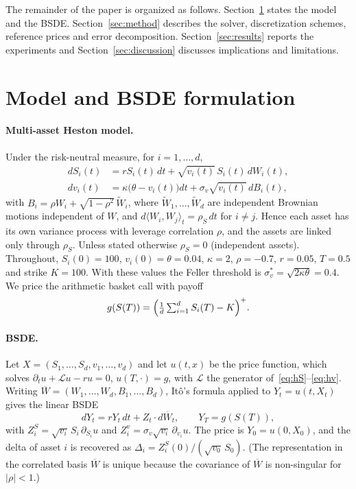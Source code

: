 The remainder of the paper is organized as follows. Section~\ref{sec:model} states the model and the BSDE. Section~\ref{sec:method} describes the solver, discretization schemes, reference prices and error decomposition. Section~\ref{sec:results} reports the experiments and Section~\ref{sec:discussion} discusses implications and limitations.

\section{Model and BSDE formulation}\label{sec:model}

\paragraph{Multi-asset Heston model.} Under the risk-neutral measure, for $i=1,\dots,d$,
\begin{align}
  dS_i(t) &= r S_i(t)\,dt + \sqrt{v_i(t)}\,S_i(t)\,dW_i(t), \label{eq:hS}\\
  dv_i(t) &= \kappa\bigl(\theta - v_i(t)\bigr)dt + \sigma_v\sqrt{v_i(t)}\,dB_i(t), \label{eq:hv}
\end{align}
with $B_i=\rho W_i+\sqrt{1-\rho^2}\,\widetilde W_i$, where $\widetilde W_1,\dots,\widetilde W_d$ are independent Brownian motions independent of $W$, and $d\langle W_i,W_j\rangle_t=\rho_S\,dt$ for $i\neq j$. Hence each asset has its own variance process with leverage correlation $\rho$, and the assets are linked only through $\rho_S$. Unless stated otherwise $\rho_S=0$ (independent assets). Throughout, $S_i(0)=100$, $v_i(0)=\theta=0.04$, $\kappa=2$, $\rho=-0.7$, $r=0.05$, $T=0.5$ and strike $K=100$. With these values the Feller threshold is $\sigma_v^{*}=\sqrt{2\kappa\theta}=0.4$. We price the arithmetic basket call with payoff
\begin{equation}
  g(S(T)) = \Bigl(\tfrac1d\textstyle\sum_{i=1}^d S_i(T)-K\Bigr)^{+}.
\end{equation}

\paragraph{BSDE.} Let $X=(S_1,\dots,S_d,v_1,\dots,v_d)$ and let $u(t,x)$ be the price function, which solves $\partial_t u+\mathcal L u-ru=0$, $u(T,\cdot)=g$, with $\mathcal L$ the generator of~\eqref{eq:hS}--\eqref{eq:hv}. Writing $\overline W=(W_1,\dots,W_d,B_1,\dots,B_d)$, It\^o's formula applied to $Y_t=u(t,X_t)$ gives the linear BSDE
\begin{equation}\label{eq:bsde}
  dY_t = rY_t\,dt + Z_t\cdot d\overline W_t,\qquad Y_T=g(S(T)),
\end{equation}
with $Z^{S}_{i}=\sqrt{v_i}\,S_i\,\partial_{S_i}u$ and $Z^{v}_{i}=\sigma_v\sqrt{v_i}\,\partial_{v_i}u$. The price is $Y_0=u(0,X_0)$, and the delta of asset $i$ is recovered as $\Delta_i=Z^S_i(0)/(\sqrt{v_0}\,S_0)$. (The representation in the correlated basis $\overline W$ is unique because the covariance of $\overline W$ is non-singular for $|\rho|<1$.)

